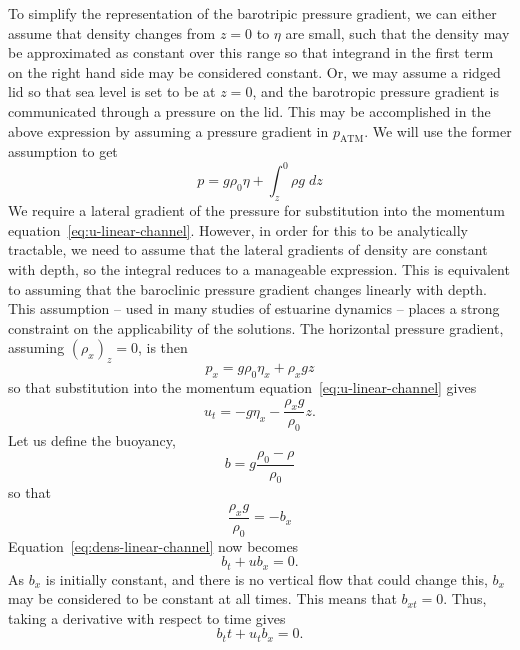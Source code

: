 \documentclass[11pt]{report}
\numberwithin{equation}{section}
\begin{document}
To simplify the representation of the barotripic pressure gradient, we can either assume that density changes from $z=0$ to $\eta$ are small, such that the density may be approximated as constant over this range so that integrand in the first term on the right hand side may be considered constant.  Or, we may assume a ridged lid so that sea level is set to be at $z=0$, and the barotropic pressure gradient is communicated through a pressure on the lid.  This may be accomplished in the above expression by assuming a pressure gradient in $p_{\mathrm{ATM}}$.  We will use the former assumption to get
\begin{equation}
    p = g \rho_0 \eta + \int_z^0 \rho g\;dz
\end{equation}
We require a lateral gradient of the pressure for substitution into the momentum equation~\ref{eq:u-linear-channel}.  However, in order for this to be analytically tractable, we need to assume that the lateral gradients of density are constant with depth, so the integral reduces to a manageable expression.  This is equivalent to assuming that the baroclinic pressure gradient changes linearly with depth.  This assumption -- used in many studies of estuarine dynamics -- places a strong constraint on the applicability of the solutions.  The horizontal pressure gradient, assuming $(\rho_x)_z = 0$, is then
\begin{equation}
    p_x = g \rho_0 \eta_x + \rho_x g z
\end{equation}
so that substitution into the momentum equation~\ref{eq:u-linear-channel} gives
\begin{equation}
    \label{eq:linear-channel-u_t}
    u_t =  -g \eta_x - \frac{\rho_x g}{\rho_0} z.
\end{equation}
Let us define the buoyancy,
\begin{equation}
    b = g\frac{\rho_0 - \rho}{\rho_0}
\end{equation}
so that
\begin{equation}
    \frac{\rho_x g}{\rho_0} = -b_x
\end{equation}
Equation~\ref{eq:dens-linear-channel} now becomes
\begin{equation}
    \label{eq:linear-channel-buoyancy}
    b_t + u b_x = 0.
\end{equation}
As $b_x$ is initially constant, and there is no vertical flow that could change this, $b_x$ may be considered to be constant at all times.  This means that $b_{xt} = 0$.  Thus, taking a derivative with respect to time gives
\begin{equation}
    b_tt + u_t b_x = 0.
\end{equation}
\end{document}
